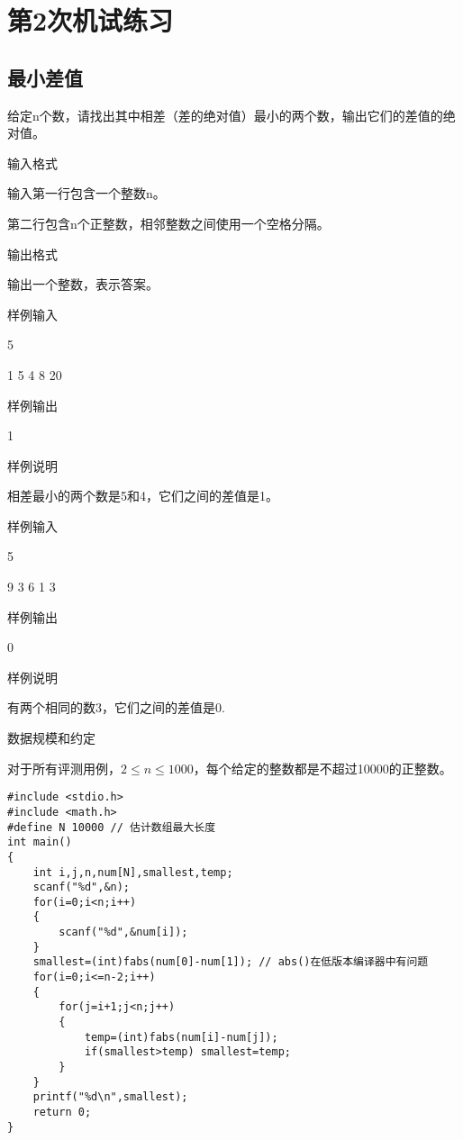 %
%
%
\chapter{第2次机试练习}

\section{最小差值}
给定n个数，请找出其中相差（差的绝对值）最小的两个数，输出它们的差值的绝对值。

输入格式

输入第一行包含一个整数n。

第二行包含n个正整数，相邻整数之间使用一个空格分隔。

输出格式

输出一个整数，表示答案。

样例输入

5

1 5 4 8 20

样例输出

1

样例说明

相差最小的两个数是5和4，它们之间的差值是1。

样例输入

5

9 3 6 1 3

样例输出

0

样例说明

有两个相同的数3，它们之间的差值是0.

数据规模和约定

对于所有评测用例，$2\le n\le1000$，每个给定的整数都是不超过10000的正整数。

\begin{lstlisting}
#include <stdio.h>
#include <math.h>
#define N 10000 // 估计数组最大长度 
int main()
{
	int i,j,n,num[N],smallest,temp;
	scanf("%d",&n);
	for(i=0;i<n;i++)
	{
		scanf("%d",&num[i]);
	}
	smallest=(int)fabs(num[0]-num[1]); // abs()在低版本编译器中有问题 
	for(i=0;i<=n-2;i++) 
	{
		for(j=i+1;j<n;j++)
		{
			temp=(int)fabs(num[i]-num[j]);
			if(smallest>temp) smallest=temp;
		}
	}
	printf("%d\n",smallest);
	return 0;
} 
\end{lstlisting}

